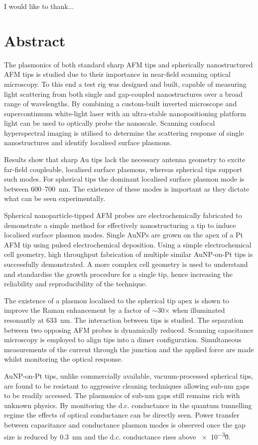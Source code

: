 \documentclass{article}
\begin{document}
I would like to thank...

\newpage
\section*{Abstract}

The plasmonics of both standard sharp AFM tips and spherically nanostructured AFM tips is studied due to their importance in near-field scanning optical microscopy.
To this end a test rig was designed and built, capable of measuring light scattering from both single and gap-coupled nanostructures over a broad range of wavelengths. By combining a custom-built inverted microscope and supercontinuum white-light laser with an ultra-stable nanopositioning platform light can be used to optically probe the nanoscale. Scanning confocal hyperspectral imaging is utilised to determine the scattering response of single nanostructures and identify localised surface plasmons.

Results show that sharp Au tips lack the necessary antenna geometry to excite far-field coupleable, localised surface plasmons, whereas spherical tips support such modes. For spherical tips the dominant localised surface plasmon mode is between 600--\SI{700}{nm}. The existence of these modes is important as they dictate what can be seen experimentally.

Spherical nanoparticle-tipped AFM probes are electrochemically fabricated to demonstrate a simple method for effectively nanostructuring a tip to induce localised surface plasmon modes. Single AuNPs are grown on the apex of a Pt AFM tip using pulsed electrochemical deposition. Using a simple electrochemical cell geometry, high throughput fabrication of multiple similar AuNP-on-Pt tips is successfully demonstrated. A more complex cell geometry is used to understand and standardise the growth procedure for a single tip, hence increasing the reliability and reproducibility of the technique.

The existence of a plasmon localised to the spherical tip apex is shown to improve the Raman enhancement by a factor of $\sim$30$\times$ when illuminated resonantly at \SI{633}{nm}.
The interaction between tips is studied. The separation between two opposing AFM probes is dynamically reduced. Scanning capacitance microscopy is employed to align tips into a dimer configuration. Simultaneous measurements of the current through the junction and the applied force are made whilst monitoring the optical response.

AuNP-on-Pt tips, unlike commercially available, vacuum-processed spherical tips, are found to be resistant to aggressive cleaning techniques allowing sub-nm gaps to be readily accessed. The plasmonics of sub-nm gaps still remains rich with unknown physics. By monitoring the d.c. conductance in the quantum tunnelling regime the effects of optical conductance can be directly seen. Power transfer between capacitance and conductance plasmon modes is observed once the gap size is reduced by \SI{0.3}{nm} and the d.c. conductance rises above \num{e-3}\G0.

\end{document}
